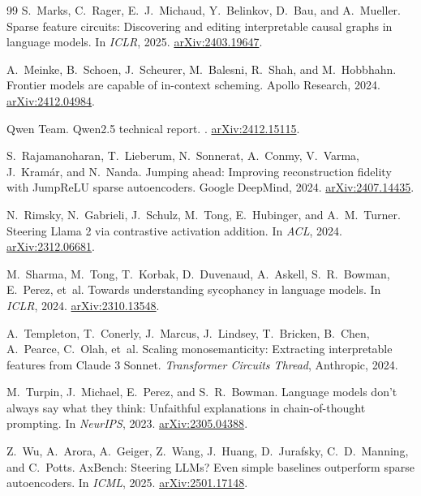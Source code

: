 \documentclass[10pt,twocolumn]{article}
\begin{document}
\begin{thebibliography}{99}
S.~Marks, C.~Rager, E.~J.~Michaud, Y.~Belinkov, D.~Bau, and A.~Mueller.
\newblock Sparse feature circuits: Discovering and editing interpretable causal graphs in language models.
\newblock In \emph{ICLR}, 2025. \href{https://arxiv.org/abs/2403.19647}{arXiv:2403.19647}.

A.~Meinke, B.~Schoen, J.~Scheurer, M.~Balesni, R.~Shah, and M.~Hobbhahn.
\newblock Frontier models are capable of in-context scheming.
\newblock Apollo Research, 2024. \href{https://arxiv.org/abs/2412.04984}{arXiv:2412.04984}.

Qwen Team.
\newblock Qwen2.5 technical report.
. \href{https://arxiv.org/abs/2412.15115}{arXiv:2412.15115}.

S.~Rajamanoharan, T.~Lieberum, N.~Sonnerat, A.~Conmy, V.~Varma, J.~Kram\'ar, and N.~Nanda.
\newblock Jumping ahead: Improving reconstruction fidelity with JumpReLU sparse autoencoders.
\newblock Google DeepMind, 2024. \href{https://arxiv.org/abs/2407.14435}{arXiv:2407.14435}.

N.~Rimsky, N.~Gabrieli, J.~Schulz, M.~Tong, E.~Hubinger, and A.~M.~Turner.
\newblock Steering Llama 2 via contrastive activation addition.
\newblock In \emph{ACL}, 2024. \href{https://arxiv.org/abs/2312.06681}{arXiv:2312.06681}.

M.~Sharma, M.~Tong, T.~Korbak, D.~Duvenaud, A.~Askell, S.~R.~Bowman, E.~Perez, et~al.
\newblock Towards understanding sycophancy in language models.
\newblock In \emph{ICLR}, 2024. \href{https://arxiv.org/abs/2310.13548}{arXiv:2310.13548}.

A.~Templeton, T.~Conerly, J.~Marcus, J.~Lindsey, T.~Bricken, B.~Chen, A.~Pearce, C.~Olah, et~al.
\newblock Scaling monosemanticity: Extracting interpretable features from Claude 3 Sonnet.
\newblock \emph{Transformer Circuits Thread}, Anthropic, 2024.

M.~Turpin, J.~Michael, E.~Perez, and S.~R.~Bowman.
\newblock Language models don't always say what they think: Unfaithful explanations in chain-of-thought prompting.
\newblock In \emph{NeurIPS}, 2023. \href{https://arxiv.org/abs/2305.04388}{arXiv:2305.04388}.

Z.~Wu, A.~Arora, A.~Geiger, Z.~Wang, J.~Huang, D.~Jurafsky, C.~D.~Manning, and C.~Potts.
\newblock AxBench: Steering LLMs? Even simple baselines outperform sparse autoencoders.
\newblock In \emph{ICML}, 2025. \href{https://arxiv.org/abs/2501.17148}{arXiv:2501.17148}.


\end{thebibliography}
\end{document}
